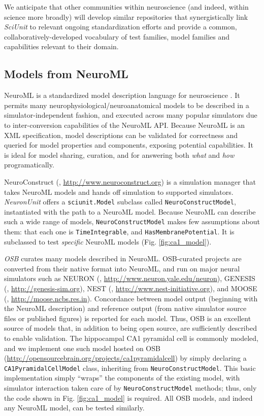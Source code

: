 \documentclass{frontiersSCNS}
\let\verbx\lstinline
\begin{document}
We anticipate that other communities within neuroscience (and indeed, within science more broadly) will develop similar repositories that synergistically link \textit{SciUnit} to relevant ongoing standardization efforts and provide a common, collaboratively-developed vocabulary of test families, model families and capabilities relevant to their domain.

\subsection{Models from NeuroML}\label{sec:neuroml_models}
NeuroML is a standardized model description language for neuroscience \citep{gleeson_neuroml:_2010}. 
It permits many neurophysiological/neuroanatomical models to be described in a simulator-independent fashion, and executed across many popular simulators due to inter-conversion capabilities of the NeuroML API. 
Because NeuroML is an XML specification, model descriptions can be validated for correctness and queried for model properties and components, exposing potential capabilities. 
It is ideal for model sharing, curation, and for answering both \textit{what} and \textit{how} programatically.  

NeuroConstruct (\cite{gleeson_neuroconstruct:_2007}, \url{http://www.neuroconstruct.org}) is a simulation manager that takes NeuroML models and hands off simulation to supported simulators. 
\textit{NeuronUnit} offers a \verbx{sciunit.Model} subclass called \verbx{NeuroConstructModel}, instantiated with the path to a NeuroML model.  
Because NeuroML can describe such a wide range of models, \verbx{NeuroConstructModel} makes few assumptions about them: that each one is \verbx{TimeIntegrable}, and \verbx{HasMembranePotential}.  
It is subclassed to test \textit{specific} NeuroML models (Fig. \ref{fig:ca1_model}). 

\textit{OSB} curates many models described in NeuroML. 
OSB-curated projects are converted from their native format into NeuroML, and run on major neural simulators such as NEURON (\cite{carnevale_neuron_2006}, \url{http://www.neuron.yale.edu/neuron}), GENESIS (\cite{bower_genesis_2007}, \url{http://genesis-sim.org}), NEST (\cite{gewaltig_nest_2007}, \url{http://www.nest-initiative.org}), and MOOSE (\cite{ray_moose_2008}, \url{http://moose.ncbs.res.in}). 
Concordance between model output (beginning with the NeuroML description) and reference output (from native simulator source files or published figures) is reported for each model. 
Thus, OSB is an excellent source of models that, in addition to being open source, are sufficiently described to enable validation. 
The hippocampal CA1 pyramidal cell is commonly modeled, and we implement one such model hosted on OSB (\url{http://opensourcebrain.org/projects/ca1pyramidalcell}) by simply declaring a \verbx{CA1PyramidalCellModel} class, inheriting from \verbx{NeuroConstructModel}.  
This basic implementation simply ``wraps'' the components of the existing model, with simulator interaction taken care of by \verbx{NeuroConstructModel} methods; 
thus, only the code shown in Fig. \ref{fig:ca1_model} is required. 
All OSB models, and indeed any NeuroML model, can be tested similarly. 
\end{document}
